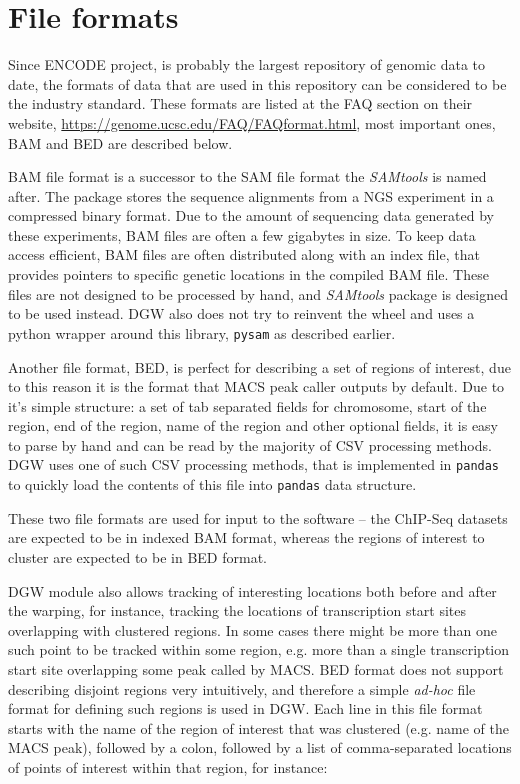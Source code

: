 \documentclass[parskip]{cs4rep}
\newcommand{\pythonpackage}[1]{{\tt #1}}
\begin{document}
\section{File formats}
Since ENCODE project, \cite{Rosenbloom:2011gw} is probably the largest repository of genomic data to date, the formats of data that are used in this repository can be considered to be the industry standard. These formats are listed at the FAQ section on their website, \url{https://genome.ucsc.edu/FAQ/FAQformat.html}, most important ones, BAM and BED are described below.

BAM file format is a successor to the SAM file format the \emph{SAMtools} is named after. The package stores the sequence alignments from a NGS experiment in a compressed binary format. Due to the amount of sequencing data generated by these experiments, BAM files are often a few gigabytes in size. 
To keep data access efficient, BAM files are often distributed along with an index file, that provides pointers to specific genetic locations in the compiled BAM file. These files are not designed to be processed by hand, and \emph{SAMtools} package is designed to be used instead. DGW also does not try to reinvent the wheel and uses a python wrapper around this library, \pythonpackage{pysam} as described earlier.

Another file format, BED, is perfect for describing a set of regions of interest, due to this reason it is the format that MACS peak caller outputs by default. Due to it's simple structure: a set of tab separated fields for chromosome, start of the region, end of the region, name of the region and other optional fields, it is easy to parse by hand and can be read by the majority of CSV processing methods.
DGW uses one of such CSV processing methods, that is implemented in \pythonpackage{pandas} to quickly load the contents of this file into \pythonpackage{pandas} data structure.

These two file formats are used for input to the software -- the ChIP-Seq datasets are expected to be in indexed BAM format, whereas the regions of interest to cluster are expected to be in BED format.

DGW module also allows tracking of interesting locations both before and after the warping, for instance, tracking the locations of transcription start sites overlapping with clustered regions. In some cases there might be more than one such point to be tracked within some region, e.g. more than a single transcription start site overlapping some peak called by MACS. BED format does not support describing disjoint regions very intuitively, and therefore a simple \emph{ad-hoc} file format for defining such regions is used in DGW. Each line in this file format starts with the name of the region of interest that was clustered (e.g. name of the MACS peak), followed by a colon, followed by a list of comma-separated locations of points of interest within that region, for instance:
\end{document}
